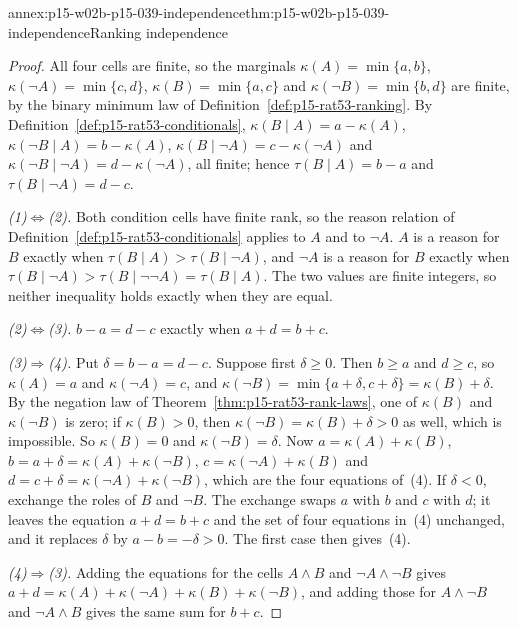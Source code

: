 \begin{annexitem}{annex:p15-w02b-p15-039-independence}{thm:p15-w02b-p15-039-independence}{Ranking independence}
\begin{proof}
All four cells are finite, so the marginals \(\kappa(A)=\min\{a,b\}\),
\(\kappa(\neg A)=\min\{c,d\}\), \(\kappa(B)=\min\{a,c\}\) and
\(\kappa(\neg B)=\min\{b,d\}\) are finite, by the binary minimum law of
Definition~\ref{def:p15-rat53-ranking}.  By
Definition~\ref{def:p15-rat53-conditionals},
\(\kappa(B\mid A)=a-\kappa(A)\), \(\kappa(\neg B\mid A)=b-\kappa(A)\),
\(\kappa(B\mid\neg A)=c-\kappa(\neg A)\) and
\(\kappa(\neg B\mid\neg A)=d-\kappa(\neg A)\), all finite; hence
\(\tau(B\mid A)=b-a\) and \(\tau(B\mid\neg A)=d-c\).

\emph{(1)\(\Leftrightarrow\)(2).}  Both condition cells have finite rank,
so the reason relation of Definition~\ref{def:p15-rat53-conditionals}
applies to \(A\) and to \(\neg A\).  \(A\) is a reason for \(B\) exactly
when \(\tau(B\mid A)>\tau(B\mid\neg A)\), and \(\neg A\) is a reason for
\(B\) exactly when \(\tau(B\mid\neg A)>\tau(B\mid\neg\neg A)=\tau(B\mid A)\).
The two values are finite integers, so neither inequality holds exactly when
they are equal.

\emph{(2)\(\Leftrightarrow\)(3).}  \(b-a=d-c\) exactly when \(a+d=b+c\).

\emph{(3)\(\Rightarrow\)(4).}  Put \(\delta=b-a=d-c\).  Suppose first
\(\delta\geq0\).  Then \(b\geq a\) and \(d\geq c\), so \(\kappa(A)=a\) and
\(\kappa(\neg A)=c\), and \(\kappa(\neg B)=\min\{a+\delta,c+\delta\}
=\kappa(B)+\delta\).  By the negation law of
Theorem~\ref{thm:p15-rat53-rank-laws}, one of \(\kappa(B)\) and
\(\kappa(\neg B)\) is zero; if \(\kappa(B)>0\), then
\(\kappa(\neg B)=\kappa(B)+\delta>0\) as well, which is impossible.  So
\(\kappa(B)=0\) and \(\kappa(\neg B)=\delta\).  Now
\(a=\kappa(A)+\kappa(B)\), \(b=a+\delta=\kappa(A)+\kappa(\neg B)\),
\(c=\kappa(\neg A)+\kappa(B)\) and \(d=c+\delta=\kappa(\neg A)+\kappa(\neg B)\),
which are the four equations of~(4).  If \(\delta<0\), exchange the roles of
\(B\) and \(\neg B\).  The exchange swaps \(a\) with \(b\) and \(c\) with
\(d\); it leaves the equation \(a+d=b+c\) and the set of four equations
in~(4) unchanged, and it replaces \(\delta\) by \(a-b=-\delta>0\).  The
first case then gives~(4).

\emph{(4)\(\Rightarrow\)(3).}  Adding the equations for the cells
\(A\land B\) and \(\neg A\land\neg B\) gives
\(a+d=\kappa(A)+\kappa(\neg A)+\kappa(B)+\kappa(\neg B)\), and adding those
for \(A\land\neg B\) and \(\neg A\land B\) gives the same sum for \(b+c\).


\end{proof}
\end{annexitem}
